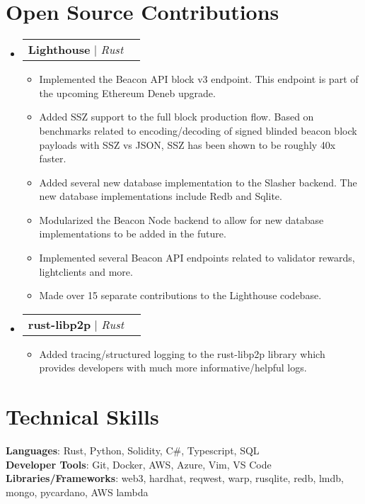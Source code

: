 \documentclass[letterpaper,11pt]{article}
\makeatletter
\newcommand{\resumeItem}[1]{
  \item\small{
    {#1 \vspace{-2pt}}
  }
}
\newcommand{\resumeProjectHeading}[2]{
    \item
    \begin{tabular*}{0.97\textwidth}{l@{\extracolsep{\fill}}r}
      \small#1 & #2 \\
    \end{tabular*}\vspace{-7pt}
}
\newcommand{\resumeSubHeadingListStart}{\begin{itemize}[leftmargin=0.15in, label={}]}
\newcommand{\resumeSubHeadingListEnd}{\end{itemize}}
\newcommand{\resumeItemListStart}{\begin{itemize}}
\newcommand{\resumeItemListEnd}{\end{itemize}\vspace{-5pt}}
\makeatother
\begin{document}
\section{Open Source Contributions}
    \resumeSubHeadingListStart
      \resumeProjectHeading
          {\textbf{Lighthouse} $|$ \emph{Rust}}{}
          \resumeItemListStart
            \resumeItem{Implemented the Beacon API block v3 endpoint. This endpoint is part of the upcoming Ethereum Deneb upgrade.}
            \resumeItem{Added SSZ support to the full block production flow. Based on benchmarks related to encoding/decoding of signed blinded beacon block payloads with SSZ vs JSON, SSZ has been shown to be roughly 40x faster.}
            \resumeItem{Added several new database implementation to the Slasher backend. The new database implementations include Redb and Sqlite.}
            \resumeItem{Modularized the Beacon Node backend to allow for new database implementations to be added in the future.}
            \resumeItem{Implemented several Beacon API endpoints related to validator rewards, lightclients and more.}
            \resumeItem{Made over 15 separate contributions to the Lighthouse codebase.}
          \resumeItemListEnd
      \resumeProjectHeading
          {\textbf{rust-libp2p} $|$ \emph{Rust}}{}
          \resumeItemListStart
            \resumeItem{Added tracing/structured logging to the rust-libp2p library which provides developers with much more informative/helpful logs.}
          \resumeItemListEnd
    \resumeSubHeadingListEnd



%
\section{Technical Skills}
 \begin{itemize}[leftmargin=0.15in, label={}]
    \small{\item{
     \textbf{Languages}{: Rust, Python, Solidity, C\#, Typescript, SQL} \\
     \textbf{Developer Tools}{: Git, Docker, AWS, Azure, Vim, VS Code} \\
     \textbf{Libraries/Frameworks}{: web3, hardhat, reqwest, warp, rusqlite, redb, lmdb, mongo, pycardano, AWS lambda}
    }}
 \end{itemize}


\end{document}
